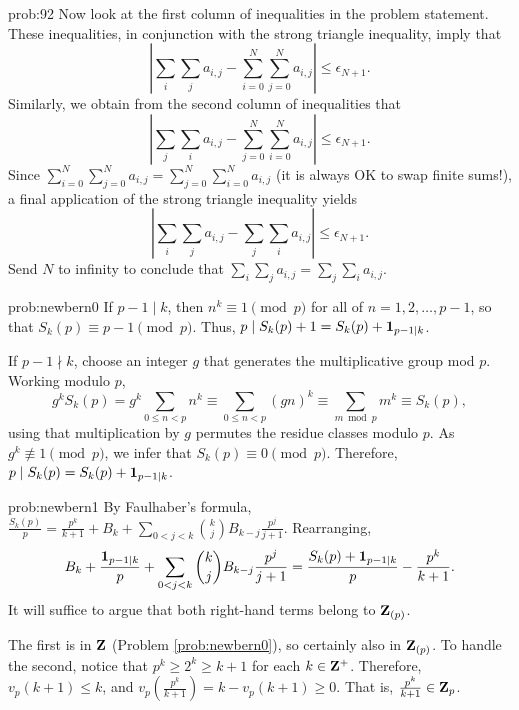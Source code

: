 \begin{sol}{prob:92}
Now look at the first column of inequalities in the problem statement. These inequalities, in conjunction with the strong triangle inequality, imply that
\[ \left|\sum_{i}\sum_{j} a_{i,j} - \sum_{i=0}^{N} \sum_{j=0}^{N} a_{i,j}\right|  \le \epsilon_{N+1}. \]
Similarly, we obtain from the second column of inequalities that
\[ \left|\sum_{j}\sum_{i} a_{i,j} - \sum_{j=0}^{N} \sum_{i=0}^{N} a_{i,j}\right|  \le \epsilon_{N+1}. \]
Since $\sum_{i=0}^{N} \sum_{j=0}^{N} a_{i,j} = \sum_{j=0}^{N} \sum_{i=0}^{N} a_{i,j}$ (it is always OK to swap  finite sums!), a final application of the strong triangle inequality yields
\[ \left|\sum_{i}\sum_{j} a_{i,j}- \sum_j\sum_i a_{i,j}\right| \le \epsilon_{N+1}.\] Send $N$ to infinity to conclude that $\sum_{i} \sum_{j} a_{i,j} = \sum_{j} \sum_{i} a_{i,j}$.
\end{sol}



\begin{sol}{prob:newbern0} If $p-1 \mid k$, then $n^k\equiv 1\pmod{p}$ for all of $n=1,2,\dots,p-1$, so that $S_k(p) \equiv p-1 \pmod{p}$. Thus, $p\mid S_k(p) + 1 = S_k(p) + \mathbf{1}_{p-1\mid k}$. 

If $p-1\nmid k$, choose an integer $g$ that generates the multiplicative group mod $p$. Working modulo $p$,
\[ g^k S_k(p) = g^k\sum_{0 \le n < p} n^k \equiv \sum_{0 \le n < p} (gn)^k \equiv \sum_{m\bmod{p}} m^k \equiv S_k(p), \]
using that multiplication by $g$ permutes the residue classes modulo $p$. As $g^k\not\equiv 1\pmod{p}$, we infer that $S_k(p)\equiv 0\pmod{p}$. Therefore, $p \mid S_k(p) = S_k(p) + \mathbf{1}_{p-1\mid k}$.
\end{sol}

\begin{sol}{prob:newbern1} By Faulhaber's formula, $\frac{S_k(p)}{p} = \frac{p^{k}}{k+1} + B_k + \sum_{0 < j < k} \binom{k}{j} B_{k-j} \frac{p^j}{j+1}$. Rearranging,
\[ B_k + \frac{\mathbf{1}_{p-1\mid k}}{p} +  \sum_{0 < j < k} \binom{k}{j} B_{k-j} \frac{p^j}{j+1}= \frac{S_k(p)+\mathbf{1}_{p-1\mid k}}{p} - \frac{p^k}{k+1}. \]
It will suffice to argue that both right-hand terms belong to $\mathbf{Z}_{(p)}$.

The first is in $\mathbf{Z}$ (Problem \ref{prob:newbern0}), so certainly also in $\mathbf{Z}_{(p)}$. To handle the second, notice that $p^k \ge 2^k \ge k+1$ for each $k \in \mathbf{Z}^{+}$. Therefore, $v_p(k+1)\le k$, and $v_p(\frac{p^k}{k+1}) = k - v_p(k+1) \ge 0$. That is, $\frac{p^k}{k+1} \in \mathbf{Z}_p$.
\end{sol}

